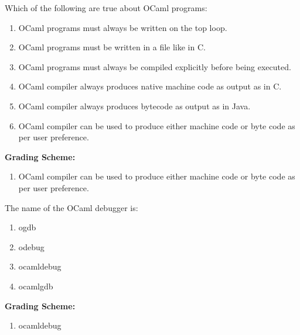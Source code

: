 \documentclass[addpoints,11pt]{exam}
\newcommand{\grade}[1]{{\color{red}\textbf{Grading Scheme:} #1}}
\begin{document}
\begin{questions}
\question Which of the following are true about OCaml programs:
\begin{enumerate}
\item OCaml programs must always be written on the top loop.
\item OCaml programs must be written in a file like in C.
\item OCaml programs must always be compiled explicitly before being executed.
\item OCaml compiler always produces native machine code as output as in C.
\item OCaml compiler always produces bytecode as output as in Java.
\item OCaml compiler can be used to produce either machine code or byte code as per user preference.
\end{enumerate}
\begin{solution}
\grade{
\begin{enumerate}
\item OCaml compiler can be used to produce either machine code or byte code as per user preference.
\end{enumerate}
}
\end{solution}

\question The name of the OCaml debugger is:
\begin{enumerate}
\item ogdb
\item odebug
\item ocamldebug
\item ocamlgdb
\end{enumerate}
\begin{solution}
\grade{
\begin{enumerate}
\item ocamldebug
\end{enumerate}
}
\end{solution}


\end{questions}
\end{document}
